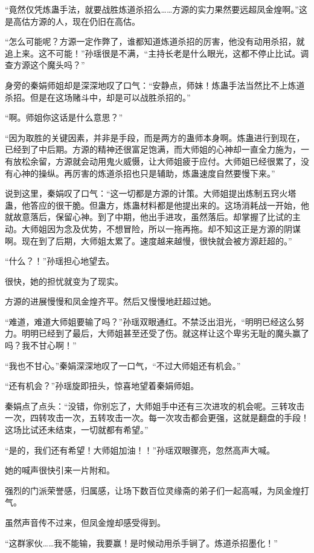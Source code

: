 \begin{this_body}
“竟然仅凭炼蛊手法，就要战胜炼道杀招么……方源的实力果然要远超凤金煌啊。”这是高估方源的人，现在仍旧在高估。

“怎么可能呢？方源一定作弊了，谁都知道炼道杀招的厉害，他没有动用杀招，就追上来。这不可能！”孙瑶很是不满，“主持长老是什么眼光，这都不停止比试。调查方源这个魔头吗？”

身旁的秦娟师姐却是深深地叹了口气：“安静点，师妹！炼蛊手法当然比不上炼道杀招。但是在这场赌斗中，却是可以战胜杀招的。”

“啊。师姐你这话是什么意思？”

“因为取胜的关键因素，并非是手段，而是两方的蛊师本身啊。炼蛊进行到现在，已经到了中后期。方源的精神还很富足饱满，而大师姐的心神却一直全力施为，一有放松余留，方源就会动用鬼火威慑，让大师姐疲于应付。大师姐已经很累了，没有心神的操纵。再厉害的炼道杀招也只是辅助，炼蛊速度自然要慢下来。”

说到这里，秦娟叹了口气：“这一切都是方源的计策。大师姐提出炼制五窍火塔蛊，他答应的很干脆。但蛊方，炼蛊材料都是他提出来的。这场消耗战一开始，他就故意落后，保留心神。到了中期，他出手进攻，虽然落后。却掌握了比试的主动。大师姐因为念及优势，不想冒险，所以一拖再拖。却不知这正是方源的阴谋啊。现在到了后期，大师姐太累了。速度越来越慢，很快就会被方源赶超的。”

“什么？！”孙瑶担心地望去。

很快，她的担忧就变为了现实。

方源的进展慢慢和凤金煌齐平。然后又慢慢地赶超过她。

“难道，难道大师姐要输了吗？”孙瑶双眼通红。不禁泛出泪光，“明明已经这么努力。明明已经到了最后，大师姐甚至还受了伤。就这样让这个卑劣无耻的魔头赢了吗？我不甘心啊！”

“我也不甘心。”秦娟深深地叹了一口气，“不过大师姐还有机会。”

“还有机会？”孙瑶旋即扭头，惊喜地望着秦娟师姐。

秦娟点了点头：“没错，你别忘了，大师姐手中还有三次进攻的机会呢。三转攻击一次，四转攻击一次，五转攻击一次。每一次攻击都会更强，这就是翻盘的手段！这场比试还未结束，一切就都有希望。”

“是的，我们还有希望！大师姐加油！！”孙瑶双眼骤亮，忽然高声大喊。

她的喊声很快引来一片附和。

强烈的门派荣誉感，归属感，让场下数百位灵缘斋的弟子们一起高喊，为凤金煌打气。

虽然声音传不过来，但凤金煌却感受得到。

“这群家伙……我不能输，我要赢！是时候动用杀手锏了。炼道杀招墨化！”


\end{this_body}
